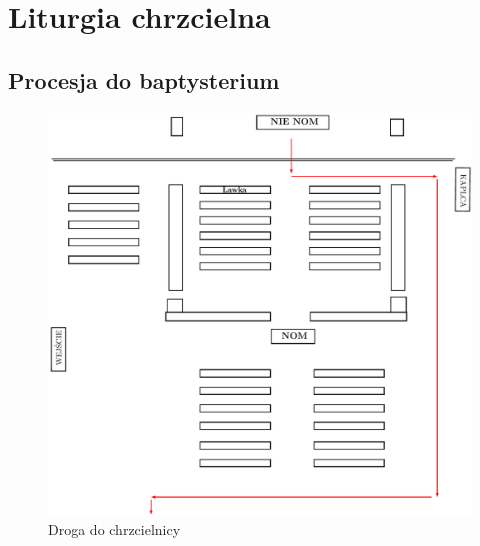 \section{Liturgia chrzcielna}

\subsection{Procesja do baptysterium}
\begin{figure}[h]
	\centering
	\includegraphics[width=0.55\linewidth]{Figures/Sobota/procesja1.pdf}
	\caption{Droga do chrzcielnicy}
	\label{fig:procesja1}
\end{figure}
